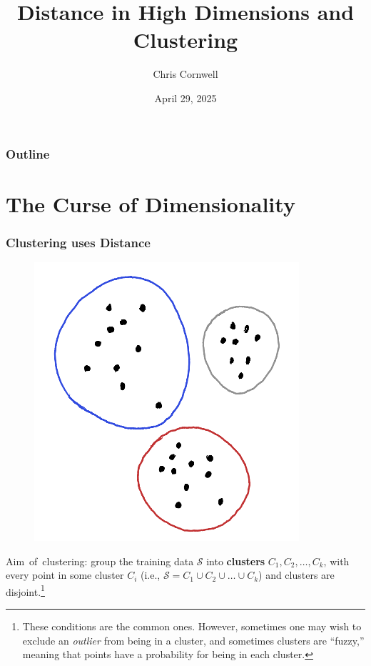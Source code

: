 \documentclass[smaller]{beamer}
\author{Chris Cornwell}
\date{April 29, 2025}
\title{Distance in High Dimensions and Clustering}
\theoremstyle{example}
\begin{document}
\begin{frame}
\titlepage
\end{frame}

\begin{frame}
    \frametitle{Outline}
    \tableofcontents
\end{frame}

\section{The Curse of Dimensionality}

\begin{frame}
    \frametitle{Clustering uses Distance}

    \begin{minipage}{\textwidth}
    \begin{figure}
        \begin{center}
            \includegraphics[height=0.4\textheight]{../../Images/clusters.png}
        \end{center}
    \end{figure}

    \vspace{\baselineskip}
    \mbox{Aim of clustering:} group the training data $\mathcal S$ into \textbf{clusters} $C_1,C_2,\ldots,C_k$, with every point in some cluster $C_i$ (i.e., $\mathcal S=C_1\cup C_2\cup\ldots \cup C_k$) and clusters are disjoint.\footnote{These conditions are the common ones. However, sometimes one may wish to exclude an \textit{outlier} from being in a cluster, and sometimes clusters are ``fuzzy,'' meaning that points have a probability for being in each cluster.} 
    

\end{minipage}
\end{frame}
\end{document}
